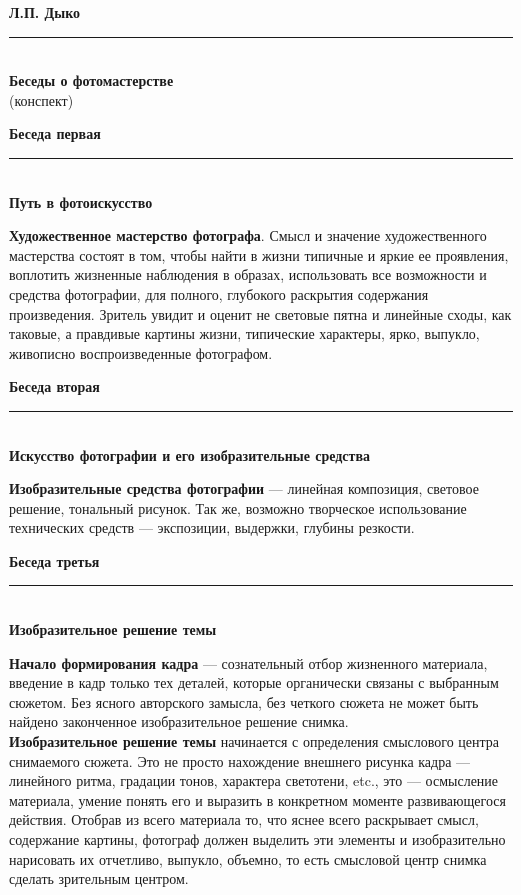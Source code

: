 \documentclass{article}
\newcommand{\important}[1]{\textbf{#1}}
\renewcommand{\section}[2]{
	\vspace{6em}
	\begin{flushright}
		\Large
		\baselineskip=0.5\baselineskip
		\textbf{#1}
		\\
		\rule[0.5\baselineskip]{\textwidth}{0.15pt}
		\\
		\textbf{#2}
	\end{flushright}
}
\renewcommand{\title}[2]{
	\begin{center}
		\LARGE
		\baselineskip=0.5\baselineskip
		\textbf{#1}
		\\
		\rule[0.5\baselineskip]{0.7\textwidth}{0.15pt}
		\\
		\textbf{#2}
		\\\baselineskip=2\baselineskip(конспект)		
	\end{center}
}
\begin{document}
\title{Л.П. Дыко}{Беседы о фотомастерстве}
\section{Беседа первая}{Путь в фотоискусство}
\important{Художественное мастерство фотографа}. Смысл и значение художественного мастерства состоят в том, чтобы найти в жизни типичные и яркие ее проявления, воплотить жизненные наблюдения в образах, использовать все возможности и средства фотографии, для полного, глубокого раскрытия содержания произведения. Зритель увидит и оценит не световые пятна и линейные сходы, как таковые, а правдивые картины жизни, типические характеры, ярко, выпукло, живописно воспроизведенные фотографом.
\section{Беседа вторая}{Искусство фотографии и его изобразительные средства}
\important{Изобразительные средства фотографии} --- линейная композиция, световое решение, тональный рисунок. Так же, возможно творческое использование технических средств --- экспозиции, выдержки, глубины резкости.
\section{Беседа третья}{Изобразительное решение темы}
\important{Начало формирования кадра} --- сознательный отбор жизненного материала, введение в кадр только тех деталей, которые органически связаны с выбранным сюжетом. Без ясного авторского замысла, без четкого сюжета не может быть найдено законченное изобразительное решение снимка.\\
\important{Изобразительное решение темы} начинается с определения смыслового центра снимаемого сюжета. Это не просто нахождение внешнего рисунка кадра --- линейного ритма, градации тонов, характера светотени, etc., это --- осмысление материала, умение понять его и выразить в конкретном моменте развивающегося действия. Отобрав из всего материала то, что яснее всего раскрывает смысл, содержание картины, фотограф должен выделить эти элементы и изобразительно нарисовать их отчетливо, выпукло, объемно, то есть смысловой центр снимка сделать зрительным центром.
\end{document}
